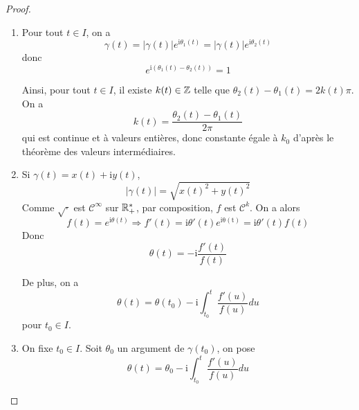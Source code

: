 \documentclass[12pt]{article}
\begin{document}
\begin{proof}
	\phantom{}
	\begin{enumerate}
		\item Pour tout $t\in I$, on a 
		\begin{equation}\gamma(t)=\vert\gamma(t)\vert e^{\mathrm{i}\theta_{1}(t)}=\vert\gamma(t)\vert e^{\mathrm{i}\theta_{2}(t)}\end{equation}
		donc 
		\begin{equation}e^{\mathrm{i}(\theta_{1}(t)-\theta_{2}(t))}=1\end{equation}

		Ainsi, pour tout $t\in I$, il existe $k(t)\in\mathbb{Z}$ telle que $\theta_{2}(t)-\theta_{1}(t)=2k(t)\pi$. On a 
		\begin{equation}k(t)=\frac{\theta_{2}(t)-\theta_{1}(t)}{2\pi}\end{equation}
		qui est continue et à valeurs entières, donc constante égale à $k_{0}$ d'après le théorème des valeurs intermédiaires.

		\item Si $\gamma(t)=x(t)+\mathrm{i}y(t)$, 
		\begin{equation}\vert\gamma(t)\vert=\sqrt{x(t)^{2}+y(t)^{2}}\end{equation}
		Comme $\sqrt{\cdot}$ est $\mathcal{C}^{\infty}$ sur $\mathbb{R}_{+}^{*}$, par composition, $f$ est $\mathcal{C}^{k}$. On a alors
		\begin{equation}f(t)=e^{\mathrm{i}\theta(t)}\Rightarrow f'(t)=\mathrm{i}\theta'(t)e^{\mathrm{i\theta(t)}}=\mathrm{i}\theta'(t)f(t)\end{equation}
		Donc 
		\begin{equation}\theta(t)=-\mathrm{i}\frac{f'(t)}{f(t)}\end{equation}

		De plus, on a 
		\begin{equation}\theta(t)=\theta(t_{0})-\mathrm{i}\int_{t_{0}}^{t}\frac{f'(u)}{f(u)}du\end{equation}
		pour $t_{0}\in I$.

		\item On fixe $t_{0}\in I$. Soit $\theta_{0}$ un argument de $\gamma(t_{0})$, on pose 
		\begin{equation}\theta(t)=\theta_{0}-\mathrm{i}\int_{t_{0}}^{t}\frac{f'(u)}{f(u)}du\end{equation}
		

\end{enumerate}
\end{proof}
\end{document}
